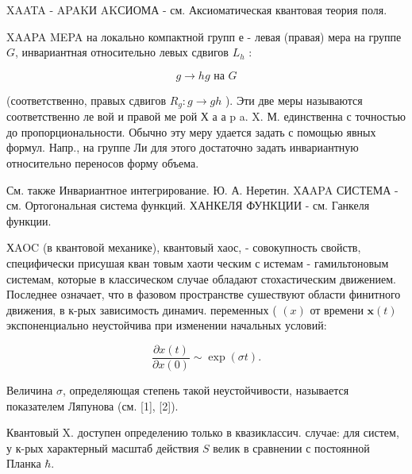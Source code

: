 \documentclass[10pt]{article}
\begin{document}
XAATA - APAKИ AKСИОМА - см. Аксиоматическая квантовая теория поля.



XAAPA MEPA на локально компактной групп е - левая (правая) мера на группе $G$, инвариантная относительно левых сдвигов $L_{h}$ :



\[

g \rightarrow h g \text { на } G

\]



(соответственно, правых сдвигов $R_{g}: g \rightarrow g h$ ). Эти две меры называются соответственно ле вой и правой ме рой Х а а p a. X. М. единственна с точностью до пропорциональности. Обычно эту меру удается задать с помощью явных формул. Напр., на группе Ли для этого достаточно задать инвариантную относительно переносов форму объема.



См. также Инвариантное интегрирование. Ю. А. Неретин. XАAPA СИСТЕМА - см. Ортогональная система функций. ХАНКЕЛЯ ФУНКЦИИ - см. Ганкеля функции.



ХAOC (в квантовой механике), квантовый хаос, - совокупность свойств, специфически присушая кван товым хаоти ческим с истемам - гамильтоновым системам, которые в классическом случае обладают стохастическим движением. Последнее означает, что в фазовом пространстве сушествуют области финитного движения, в к-рых зависимость динамич. переменных ( $(x)$ от времени $\boldsymbol{x}(t)$ экспоненциально неустойчива при изменении начальных условий:



\[

\frac{\partial x(t)}{\partial x(0)} \sim \exp (\sigma t) .

\]



Величина $\sigma$, определяющая степень такой неустойчивости, называется показателем Ляпунова (см. [1], [2]).



Квантовый X. доступен определению только в квазиклассич. случае: для систем, у к-рых характерный масштаб действия $S$ велик в сравнении с постоянной Планка $\hbar$.
\end{document}
